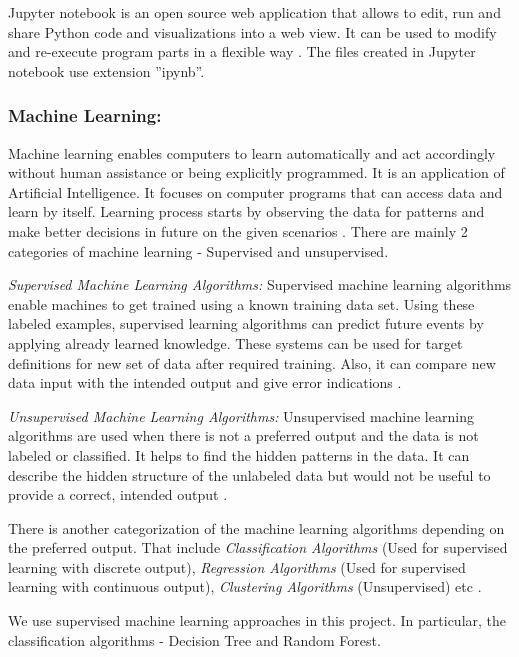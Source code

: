 \documentclass[sigconf]{acmart}
\begin{document}
Jupyter notebook is an open source web application that allows to edit, run and share Python code and visualizations into a web view. It can be used to modify and re-execute program parts in a flexible way \cite{jupyter}. The files created in Jupyter notebook use extension ''ipynb''. 

\subsubsection{Machine Learning:}

Machine learning enables computers to learn automatically and act accordingly without human assistance or being explicitly programmed. It is an application of Artificial Intelligence. It focuses on computer programs that can access data and learn by itself. Learning process starts by observing the data for patterns and make better decisions in future on the given scenarios \cite{machine-learning}. There are mainly 2 categories of machine learning - Supervised and unsupervised.

\textit{Supervised Machine Learning Algorithms:} Supervised machine learning algorithms enable machines to get trained using a known training data set. Using these labeled examples, supervised learning algorithms can predict future events by applying already learned knowledge. These systems can be used for target definitions for new set of data after required training. Also, it can compare new data input with the intended output and give error indications \cite{machine-learning}. 

\textit{Unsupervised Machine Learning Algorithms:} Unsupervised machine learning algorithms are used when there is not a preferred output and the data is not labeled or classified. It helps to find the hidden patterns in the data. It can describe the hidden structure of the unlabeled data but would not be useful to provide a correct, intended output \cite{machine-learning}. 

There is another categorization of the machine learning algorithms depending on the preferred output. That include \emph{Classification Algorithms} (Used for supervised learning with discrete output), \emph{Regression Algorithms} (Used for supervised learning with continuous output), \emph{Clustering Algorithms} (Unsupervised) etc \cite{wiki-machine-learning}.

We use supervised machine learning approaches in this project. In particular, the classification algorithms - Decision Tree and Random Forest.
\end{document}
